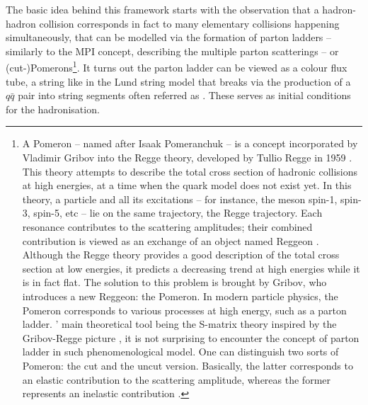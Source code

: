 The basic idea behind this framework starts with the observation that a hadron-hadron collision corresponds in fact to many elementary collisions happening simultaneously, that can be modelled via the formation of parton ladders -- similarly to the MPI concept, describing the multiple parton scatterings -- or (cut-)Pomerons\footnote{A Pomeron -- named after Isaak Pomeranchuk -- is a concept incorporated by Vladimir Gribov into the Regge theory, developed by Tullio Regge in 1959 \cite{reggeIntroductionComplexOrbital1959}. This theory attempts to describe the total cross section of hadronic collisions at high energies, at a time when the quark model does not exist yet. In this theory, a particle and all its excitations -- for instance, the \rhoMes meson spin-1, spin-3, spin-5, etc -- lie on the same trajectory, the Regge trajectory. Each resonance contributes to the scattering amplitudes; their combined contribution is viewed as an exchange of an object named Reggeon \cite{levinEverythingReggeonsPart1998}. Although the Regge theory provides a good description of the total cross section at low energies, it predicts a decreasing trend at high energies while it is in fact flat. The solution to this problem is brought by Gribov, who introduces a new Reggeon: the Pomeron. In modern particle physics, the Pomeron corresponds to various processes at high energy, such as a parton ladder. \Epos' main theoretical tool being the S-matrix theory inspired by the Gribov-Regge picture \cite{wernerCorecoronaProcedureMicrocanonical2023}, it is not surprising to encounter the concept of parton ladder in such phenomenological model. One can distinguish two sorts of Pomeron: the cut and the uncut version. Basically, the latter corresponds to an elastic contribution to the scattering amplitude, whereas the former represents an inelastic contribution \cite{wernerMonteCarloEvent2022}.}. It turns out the parton ladder can be viewed as a colour flux tube, a string like in the Lund string model that breaks via the production of a $q\bar{q}$ pair into string segments often referred as . These serves as initial conditions for the hadronisation.

